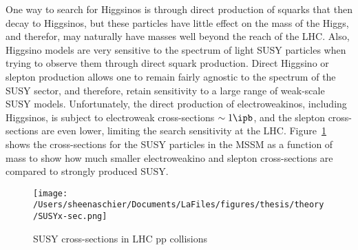 One way to search for Higgsinos is through direct production of squarks that then decay to Higgsinos, but these particles have little effect on the mass of the Higgs, and therefor, may naturally have masses well beyond the reach of the LHC.  Also, Higgsino models are very sensitive to the spectrum of light SUSY particles when trying to observe them through direct squark production.  Direct Higgsino or slepton production allows one to remain fairly agnostic to the spectrum of the SUSY sector, and therefore, retain sensitivity to a large range of weak-scale SUSY models.  Unfortunately, the direct production of electroweakinos, including Higgsinos, is subject to electroweak cross-sections $\sim 1\ipb$, and the slepton cross-sections are even lower, limiting the search sensitivity at the LHC.  Figure~\ref{fig:thy:xsec} shows the cross-sections for the SUSY particles in the MSSM as a function of mass to show how much smaller electroweakino and slepton cross-sections are compared to strongly produced SUSY.

     \begin{figure}%
  \begin{center}
  \texttt{[image: /Users/sheenaschier/Documents/LaFiles/figures/thesis/theory/SUSYx-sec.png]}
   \end{center}
 \caption{SUSY cross-sections in LHC pp collisions~\cite{Bechtle:2015nta}}
 \label{fig:thy:xsec}
 \end{figure}

